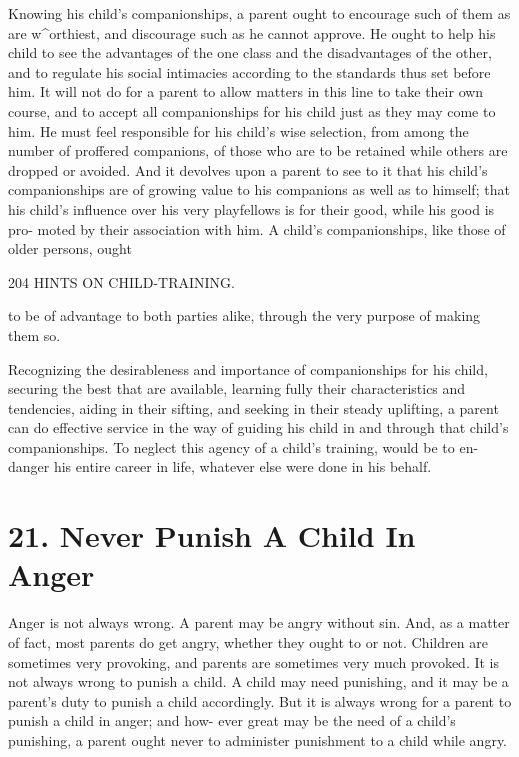 \documentclass[
]{book}
\begin{document}
Knowing his child's companionships, a parent ought to encourage such of them as are w\^{}orthiest, and discourage such as he cannot approve. He ought to help his child to see the advantages of the one class and the disadvantages of the other, and to regulate his social intimacies according to the standards thus set before him. It will not do for a parent to allow matters in this line to take their own course, and to accept all companionships for his child just as they may come to him. He must feel responsible for his child's wise selection, from among the number of proffered companions, of those who are to be retained while others are dropped or avoided. And it devolves upon a parent to see to it that his child's companionships are of growing value to his companions as well as to himself; that his child's influence over his very playfellows is for their good, while his good is pro- moted by their association with him. A child's companionships, like those of older persons, ought

204 HINTS ON CHILD-TRAINING.

to be of advantage to both parties alike, through the very purpose of making them so.

Recognizing the desirableness and importance of companionships for his child, securing the best that are available, learning fully their characteristics and tendencies, aiding in their sifting, and seeking in their steady uplifting, a parent can do effective service in the way of guiding his child in and through that child's companionships. To neglect this agency of a child's training, would be to en- danger his entire career in life, whatever else were done in his behalf.

\hypertarget{never-punish-a-child-in-anger}{%
\chapter{21. Never Punish A Child In Anger}\label{never-punish-a-child-in-anger}}

Anger is not always wrong. A parent may be angry without sin. And, as a matter of fact, most parents do get angry, whether they ought to or not. Children are sometimes very provoking, and parents are sometimes very much provoked. It is not always wrong to punish a child. A child may need punishing, and it may be a parent's duty to punish a child accordingly. But it is always wrong for a parent to punish a child in anger; and how- ever great may be the need of a child's punishing, a parent ought never to administer punishment to a child while angry.
\end{document}
